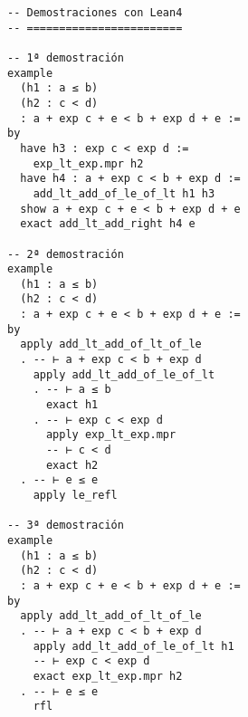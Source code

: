 \begin{verbatim}
-- Demostraciones con Lean4
-- ========================

-- 1ª demostración
example
  (h1 : a ≤ b)
  (h2 : c < d)
  : a + exp c + e < b + exp d + e :=
by
  have h3 : exp c < exp d :=
    exp_lt_exp.mpr h2
  have h4 : a + exp c < b + exp d :=
    add_lt_add_of_le_of_lt h1 h3
  show a + exp c + e < b + exp d + e
  exact add_lt_add_right h4 e

-- 2ª demostración
example
  (h1 : a ≤ b)
  (h2 : c < d)
  : a + exp c + e < b + exp d + e :=
by
  apply add_lt_add_of_lt_of_le
  . -- ⊢ a + exp c < b + exp d
    apply add_lt_add_of_le_of_lt
    . -- ⊢ a ≤ b
      exact h1
    . -- ⊢ exp c < exp d
      apply exp_lt_exp.mpr
      -- ⊢ c < d
      exact h2
  . -- ⊢ e ≤ e
    apply le_refl

-- 3ª demostración
example
  (h1 : a ≤ b)
  (h2 : c < d)
  : a + exp c + e < b + exp d + e :=
by
  apply add_lt_add_of_lt_of_le
  . -- ⊢ a + exp c < b + exp d
    apply add_lt_add_of_le_of_lt h1
    -- ⊢ exp c < exp d
    exact exp_lt_exp.mpr h2
  . -- ⊢ e ≤ e
    rfl
\end{verbatim}

